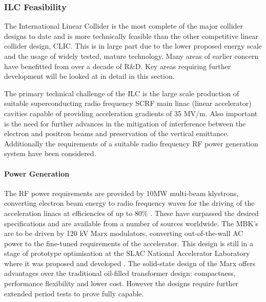 \subsubsection{ILC Feasibility}

The International Linear Collider is the most complete of the major collider designs to date and is more technically feasible than the other competitive linear collider design, CLIC. This is in large part due to the lower proposed energy scale and the usage of widely tested, mature technology. Many areas of earlier concern have benefitted from over a decade of R\&D. Key areas requiring further development will be looked at in detail in this section.

The primary technical challenge of the ILC is the large scale production of suitable superconducting radio frequency SCRF main linac (linear accelerator) cavities capable of providing acceleration gradients of 35 MV/m. Also important is the need for further advances in the mitigation of interference between the electron and positron beams and preservation of the vertical emittance. Additionally the requirements of a suitable radio frequency RF power generation system have been considered.

\paragraph{Power Generation}

The RF power requirements are provided by 10MW multi-beam klystrons, converting electron beam energy to radio frequency waves for the driving of the acceleration linacs at efficiencies of up to 80\% \cite{LINAC:Klystron}. These have surpassed the desired specifications and are available from a number of sources worldwide. The MBK's are to be driven by 120 kV Marx modulators, converting out-of-the-wall AC power to the fine-tuned requirements of the accelerator. This design is still in a stage of prototype optimisation at the SLAC National Accelerator Laboratory where it was proposed and developed \cite{LINAC:Marx}. The solid-state design of the Marx offers advantages over the traditional oil-filled transformer design: compactness, performance flexibility and lower cost. However the designs require further extended period tests to prove fully capable.

